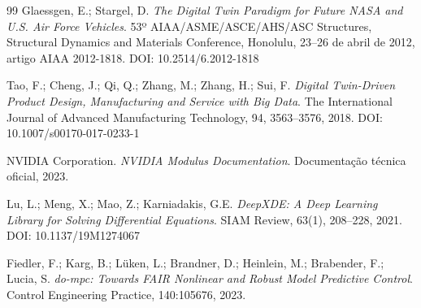 \documentclass[12pt,a4paper]{article}
\numberwithin{equation}{section}
\numberwithin{table}{section}
\numberwithin{figure}{section}
\begin{document}
\begin{thebibliography}{99}
 Glaessgen, E.; Stargel, D. \textit{The Digital Twin Paradigm for Future NASA and U.S. Air Force Vehicles}. 53º AIAA/ASME/ASCE/AHS/ASC Structures, Structural Dynamics and Materials Conference, Honolulu, 23–26 de abril de 2012, artigo AIAA 2012-1818. DOI: 10.2514/6.2012-1818

 Tao, F.; Cheng, J.; Qi, Q.; Zhang, M.; Zhang, H.; Sui, F. \textit{Digital Twin-Driven Product Design, Manufacturing and Service with Big Data}. The International Journal of Advanced Manufacturing Technology, 94, 3563–3576, 2018. DOI: 10.1007/s00170-017-0233-1

 NVIDIA Corporation. \textit{NVIDIA Modulus Documentation}. Documentação técnica oficial, 2023.

 Lu, L.; Meng, X.; Mao, Z.; Karniadakis, G.E. \textit{DeepXDE: A Deep Learning Library for Solving Differential Equations}. SIAM Review, 63(1), 208–228, 2021. DOI: 10.1137/19M1274067

 Fiedler, F.; Karg, B.; Lüken, L.; Brandner, D.; Heinlein, M.; Brabender, F.; Lucia, S. \textit{do-mpc: Towards FAIR Nonlinear and Robust Model Predictive Control}. Control Engineering Practice, 140:105676, 2023.

\end{thebibliography}
\end{document}
